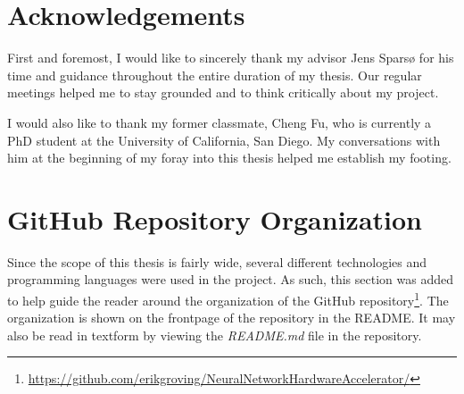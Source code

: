 \chapter{Acknowledgements}

First and foremost, I would like to sincerely thank my advisor Jens Sparsø for his time and guidance throughout the entire duration of my thesis. Our regular meetings helped me to stay grounded and to think critically about my project.

I would also like to thank my former classmate, Cheng Fu, who is currently a PhD student at the University of California, San Diego. My conversations with him at the beginning of my foray into this thesis helped me establish my footing.

\chapter{GitHub Repository Organization}
Since the scope of this thesis is fairly wide, several different technologies and programming languages were used in the project. As such, this section was added to help guide the reader around the organization of the GitHub repository\footnote{\url{
		https://github.com/erikgroving/NeuralNetworkHardwareAccelerator/}}. 
The organization is shown on the frontpage of the repository in the README. It may also be read in textform by viewing the \textit{README.md} file in the repository.
